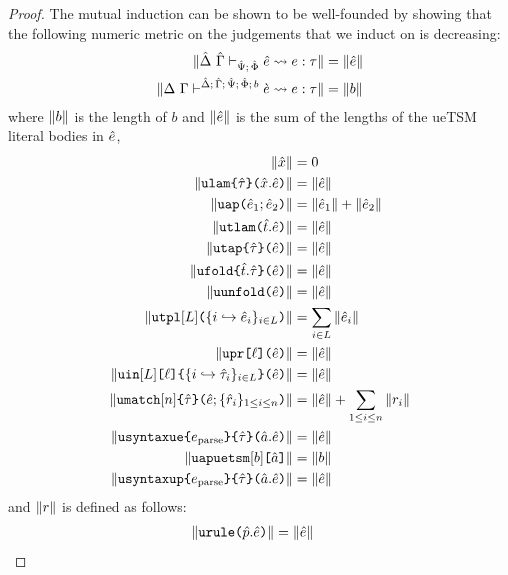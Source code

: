 {{{{\begin{proof}
The mutual induction can be shown to be well-founded by showing that the following numeric metric on the judgements that we induct on is decreasing:
\begin{align*}
\sizeof{\expandsUP{\uDelta}{\uGamma}{\uPsi}{\uPhi}{\ue}{e}{\tau}} & = \sizeof{\ue}\\
\sizeof{\cvalidE{\Delta}{\Gamma}{\esceneUP{\uDelta}{\uGamma}{\uPsi}{\uPhi}{b}}{\ce}{e}{\tau}} & = \sizeof{b}
\end{align*}
where $\sizeof{b}$ is the length of $b$ and $\sizeof{\ue}$ is the sum of the lengths of the ueTSM literal bodies in $\ue$,
\begin{align*}
\sizeof{\ux} & = 0\\
\sizeof{\aulam{\utau}{\ux}{\ue}} &= \sizeof{\ue}\\
\sizeof{\auap{\ue_1}{\ue_2}} & = \sizeof{\ue_1} + \sizeof{\ue_2}\\
\sizeof{\autlam{\ut}{\ue}} & = \sizeof{\ue}\\
\sizeof{\autap{\ue}{\utau}} & = \sizeof{\ue}\\
\sizeof{\aufold{\ut}{\utau}{\ue}} & = \sizeof{\ue}\\
\sizeof{\auunfold{\ue}} & = \sizeof{\ue}\\
\sizeof{\autpl{\labelset}{\mapschema{\ue}{i}{\labelset}}} & = \sum_{i \in \labelset} \sizeof{\ue_i}\\
\sizeof{\aupr{\ell}{\ue}} & = \sizeof{\ue}\\
\sizeof{\auin{\labelset}{\ell}{\mapschema{\utau}{i}{\labelset}}{\ue}} & = \sizeof{\ue}\\
\sizeof{\aumatchwith{n}{\utau}{\ue}{\seqschemaX{\urv}}} & = \sizeof{\ue} + \sum_{1 \leq i \leq n} \sizeof{r_i}\\
\sizeof{\audefuetsm{\utau}{\eparse}{\tsmv}{\ue}} & = \sizeof{\ue}\\
\sizeof{\autsmap{b}{\tsmv}} & = \sizeof{b}\\
\sizeof{\audefuptsm{\utau}{\eparse}{\tsmv}{\ue}} & = \sizeof{\ue}
\end{align*}
and $\sizeof{r}$ is defined as follows:
\begin{align*}
\sizeof{\aumatchrule{\upv}{\ue}} & = \sizeof{\ue}
\end{align*}


\end{proof}}}}}
